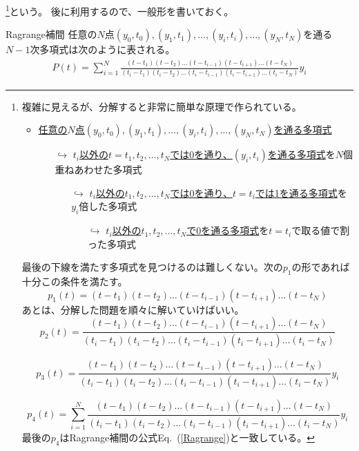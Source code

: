 \documentclass[autodetect-engine,dvipdfmx-if-dvi,ja=standard,a4paper,layout=v2]{bxjsreport}
\newcommand{\eref}[1]{Eq.~(\ref{#1})}
\begin{document}
    \footnote{
    複雑に見えるが、分解すると非常に簡単な原理で作られている。\par
    \begin{itemize}
          \item \underline{任意の$N$点$(y_0, t_0), (y_1, t_1),\dots ,(y_i,t_i),\dots ,(y_N,t_N)$を通る多項式}
            \begin{itemize}
               \item[$\hookrightarrow$] \underline{$t_i$以外の$t=t_1,t_2,\dots,t_N$では0を通り、$(y_i,t_i)$を通る多項式}を$N$個重ねあわせた多項式
                 \begin{itemize}
                   \item[$\hookrightarrow$] \underline{$t_i$以外の$t_1,t_2,\dots,t_N$では0を通り、$t=t_i$では1を通る多項式}を$y_i$倍した多項式
                     \begin{itemize}
                         \item[$\hookrightarrow$] \underline{$t_i$以外の$t_1,t_2,\dots,t_N$で0を通る多項式}を$t=t_i$で取る値で割った多項式
                     \end{itemize}
                 \end{itemize}
               \end{itemize}
    \end{itemize}
    最後の下線を満たす多項式を見つけるのは難しくない。次の$p_1$の形であれば十分この条件を満たす。
    \[
      p_1(t)=(t-t_1)(t-t_2)\dots(t-t_{i-1})(t-t_{i+1})\dots(t-t_N)
    \]
    あとは、分解した問題を順々に解いていけばいい。
    \[
      p_2(t)=\frac{(t-t_1)(t-t_2)\dots(t-t_{i-1})(t-t_{i+1})\dots(t-t_N)}{(t_i-t_1)(t_i-t_2)\dots(t_i-t_{i-1})(t_i-t_{i+1})\dots(t_i-t_N)}
    \]

    \[
      p_3(t)=\frac{(t-t_1)(t-t_2)\dots(t-t_{i-1})(t-t_{i+1})\dots(t-t_N)}{(t_i-t_1)(t_i-t_2)\dots(t_i-t_{i-1})(t_i-t_{i+1})\dots(t_i-t_N)}y_i
    \]

    \[
      p_4(t)=\sum^{N}_{i=1}\frac{(t-t_1)(t-t_2)\dots(t-t_{i-1})(t-t_{i+1})\dots(t-t_N)}
      {(t_i-t_1)(t_i-t_2)\dots(t_i-t_{i-1})(t_i-t_{i+1})\dots(t_i-t_N)}y_i
    \]
    最後の$p_4$はRagrange補間の公式\eref{Ragrange}と一致している。\par
    }という。
    後に利用するので、一般形を書いておく。
    \begin{itembox}[l]{Ragrange補間}
      任意の$N$点$(y_0, t_0), (y_1, t_1),\dots ,(y_i,t_i),\dots ,(y_N,t_N)$を通る$N-1$次多項式は次のように表される。\\
      \begin{align}
        P(t) = \sum^{N}_{i=1}\frac{(t-t_1)(t-t_2)\dots(t-t_{i-1})(t-t_{i+1})\dots(t-t_N)}{(t_i-t_1)(t_i-t_2)\dots(t_i-t_{i-1})(t_i-t_{i+1})\dots(t_i-t_N)}y_i\label{Ragrange}
      \end{align}
    \end{itembox}
\end{document}

